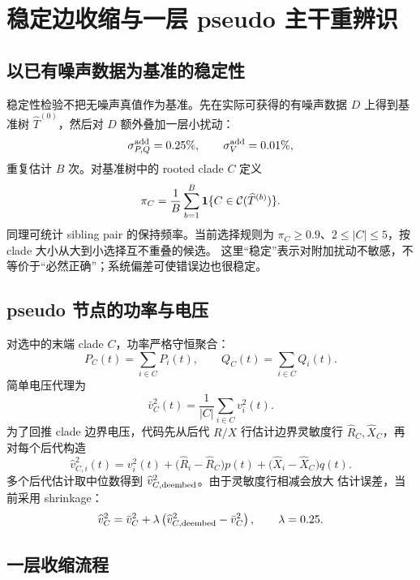 \section{稳定边收缩与一层 pseudo 主干重辨识}

\subsection{以已有噪声数据为基准的稳定性}

稳定性检验不把无噪声真值作为基准。先在实际可获得的有噪声数据 $D$ 上得到基准树
$\widehat T^{(0)}$，然后对 $D$ 额外叠加一层小扰动：
\[
\sigma_{P,Q}^{\rm add}=0.25\%,\qquad
\sigma_V^{\rm add}=0.01\%,
\]
重复估计 $B$ 次。对基准树中的 rooted clade $C$ 定义
\begin{equation}
  \pi_C=\frac{1}{B}\sum_{b=1}^{B}
  \mathbf{1}\{C\in\mathcal{C}(\widehat T^{(b)})\}.
  \label{eq:bootstrap-confidence}
\end{equation}
同理可统计 sibling pair 的保持频率。当前选择规则为
$\pi_C\ge0.9$、$2\le |C|\le5$，按 clade 大小从大到小选择互不重叠的候选。
这里“稳定”表示对附加扰动不敏感，不等价于“必然正确”；系统偏差可使错误边也很稳定。

\subsection{pseudo 节点的功率与电压}

对选中的末端 clade $C$，功率严格守恒聚合：
\begin{equation}
  P_C(t)=\sum_{i\in C}P_i(t),\qquad
  Q_C(t)=\sum_{i\in C}Q_i(t).
  \label{eq:pseudo-pq}
\end{equation}
简单电压代理为
\[
\bar v_C^2(t)=\frac{1}{|C|}\sum_{i\in C}v_i^2(t).
\]
为了回推 clade 边界电压，代码先从后代 $R/X$ 行估计边界灵敏度行
$\widehat R_C,\widehat X_C$，再对每个后代构造
\begin{equation}
  \widehat v_{C,i}^2(t)=v_i^2(t)
  +\bigl(\widehat R_i-\widehat R_C\bigr)p(t)
  +\bigl(\widehat X_i-\widehat X_C\bigr)q(t).
  \label{eq:deembedding}
\end{equation}
多个后代估计取中位数得到 $\widehat v_{C,\rm deembed}^2$。由于灵敏度行相减会放大
估计误差，当前采用 shrinkage：
\begin{equation}
  \widehat v_C^2=
  \bar v_C^2+\lambda
  \left(\widehat v_{C,\rm deembed}^2-\bar v_C^2\right),
  \qquad \lambda=0.25.
  \label{eq:voltage-shrinkage}
\end{equation}

\subsection{一层收缩流程}

